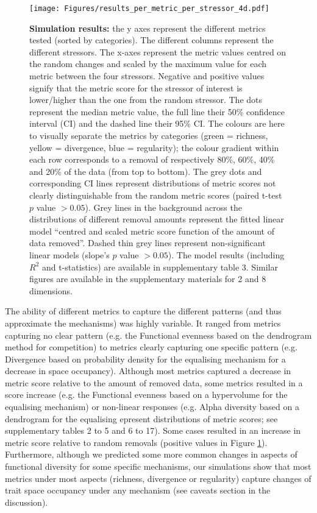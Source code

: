 \documentclass[12pt,letterpaper]{article}
\begin{document}
\begin{figure}[!htbp]
\centering
   \texttt{[image: Figures/results\_per\_metric\_per\_stressor\_4d.pdf]}
\caption{\scriptsize{\textbf{Simulation results:} the y axes represent the different metrics tested (sorted by categories).
The different columns represent the different stressors. The x-axes represent the metric values centred on the random changes and scaled by the maximum value for each metric between the four stressors.
Negative and positive values signify that the metric score for the stressor of interest is lower/higher than the one from the random stressor.
The dots represent the median metric value, the full line their 50\% confidence interval (CI) and the dashed line their 95\% CI.
The colours are here to visually separate the metrics by categories (green = richness, yellow = divergence, blue = regularity); the colour gradient within each row corresponds to a removal of respectively 80\%, 60\%, 40\% and 20\% of the data (from top to bottom).
The grey dots and corresponding CI lines represent distributions of metric scores not clearly distinguishable from the random metric scores (paired t-test $p$ value $> 0.05$).
Grey lines in the background across the distributions of different removal amounts represent the fitted linear model ``centred and scaled metric score function of the amount of data removed''.
Dashed thin grey lines represent non-significant linear models (slope's $p$ value $> 0.05$).
The model results (including $R^{2}$ and t-statistics) are available in supplementary table 3.
Similar figures are available in the supplementary materials for 2 and 8 dimensions.}}
\label{Fig:simulation_results}
\end{figure}
\bigskip

The ability of different metrics to capture the different patterns (and thus approximate the mechanisms) was highly variable.
It ranged from metrics capturing no clear pattern (e.g. the Functional evenness based on the dendrogram method for competition) to metrics clearly capturing one specific pattern (e.g. Divergence based on probability density for the equalising mechanism for a decrease in space occupancy).
Although most metrics captured a decrease in metric score relative to the amount of removed data, some metrics resulted in a score increase (e.g. the Functional evenness based on a hypervolume for the equalising mechanism) or non-linear responses (e.g. Alpha diversity based on a dendrogram for the equalising epresent distributions of metric scores; see supplementary tables 2 to 5 and 6 to 17).
Some cases resulted in an increase in metric score relative to random removals (positive values in Figure \ref{Fig:simulation_results}).
Furthermore, although we predicted some more common changes in aspects of functional diversity for some specific mechanisms, our simulations show that most metrics under most aspects (richness, divergence or regularity) capture changes of trait space occupancy under any mechanism (see caveats section in the discussion).
\end{document}
